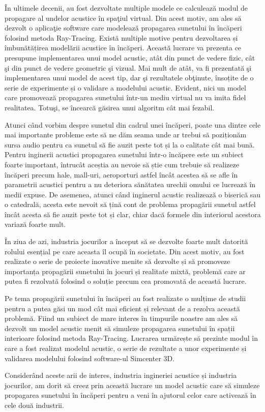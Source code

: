	\^{I}n ultimele decenii, au fost dezvoltate multiple modele ce calculeaz\u{a} modul de propagare al undelor acustice \^{i}n spa\c{t}iul virtual. Din acest motiv, am ales s\u{a} dezvolt o aplica\c{t}ie software care modeleaz\u{a} propagarea sunetului în încăperi folosind metoda Ray-Tracing. Exist\u{a} multiple motive pentru dezvoltarea și îmbunătățirea model\u{a}rii acustice \^{i}n \^{i}nc\u{a}peri. Aceast\u{a} lucrare va prezenta ce presupune implementarea unui model acustic, at\^{a}t din punct de vedere fizic, c\^{a}t \c{s}i din punct de vedere geometric \c{s}i vizual. Mai mult de at\^{a}t, va fi prezentat\u{a} \c{s}i implementarea unui model de acest tip, dar \c{s}i rezultatele ob\c{t}inute, însoțite de o serie de experimente și o validare a modelului acustic. Evident, nici un model care promovează propagarea sunetului \^{i}ntr-un mediu virtual nu va imita fidel realitatea. Totu\c{s}i, se \^{i}ncearc\u{a} g\u{a}sirea unui algoritm c\^{a}t mai fezabil.

	Atunci când vorbim despre sunetul din cadrul unei încăperi, poate una dintre cele mai importante probleme este să ne dăm seama unde ar trebui să poziționăm sursa audio pentru ca sunetul să fie auzit peste tot și la o calitate cât mai bună. Pentru inginerii acustici propagarea sunetului într-o încăpere este un subiect foarte important, întrucât aceștia au nevoie să știe cum trebuie să realizeze încăperi precum hale, mall-uri, aeroporturi astfel încât acestea să se afle în parametrii acustici pentru a nu deteriora sănătatea urechii omului ce lucrează în medii expuse. De asemenea, atunci când inginerul acustic realizează o biserică sau o catedrală, acesta este nevoit să țină cont de problema propagării sunetul astfel încât acesta să fie auzit peste tot și clar, chiar dacă formele din interiorul acestora variază foarte mult.
	
	În ziua de azi, industria jocurilor a început să se dezvolte foarte mult datorită rolului esențial pe care aceasta îl ocupă în societate. Din acest motiv, au fost realizate o serie de proiecte inovative menite să dezvolte și să promoveze importanța propagării sunetului în jocuri și realitate mixtă, problemă care ar putea fi rezolvată folosind o soluție precum cea promovată de această lucrare.
	
	Pe tema propagării sunetului în încăperi au fost realizate o mulțime de studii pentru a putea găsi un mod cât mai eficient și relevant de a rezolva această problemă. Fiind un subiect de mare interes în timpurile noastre am ales să dezvolt un model acustic menit să simuleze propagarea sunetului în spații interioare folosind metoda Ray-Tracing. Lucrarea urmărește să prezinte modul în care a fost realizat modelul acustic, o serie de rezultate a unor experimente și validarea modelului folosind software-ul Simcenter 3D.
	
	Considerând aceste arii de interes, industria ingineriei acustice și industria jocurilor, am dorit să creez prin această lucrare un model acustic care să simuleze propagarea sunetului în încăperi pentru a veni în ajutorul celor care activează în cele două industrii.